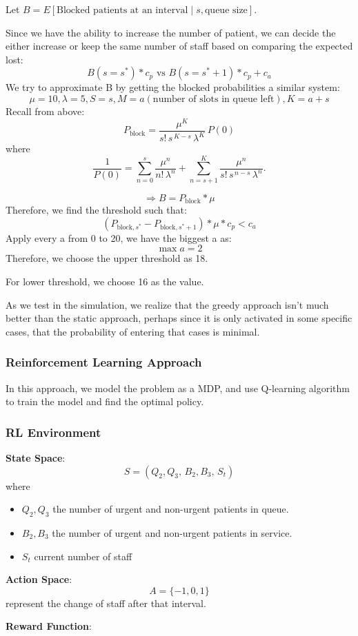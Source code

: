 \documentclass{article}
\begin{document}
Let $B = E[\text{Blocked patients at an interval} \mid s, \text{queue size}]$.

Since we have the ability to increase the number of patient, we can decide the either
increase or keep the same number of staff based on comparing the expected lost:
\[B(s = s^*) * c_p \text{ vs } B(s = s^*+1)* c_p + c_a\]
We try to approximate B by getting the blocked probabilities a similar system:
\[\mu = 10, \lambda = 5, S = s, M = a (\text{number of slots in queue left}), K = a+s\]
Recall from above:
\[P_{\text{block}} =\frac{\mu^K}{s!\,s^{\,K-s}\,\lambda^K} \, P(0)\]
where 
\[\dfrac{1}{P(0)}=\sum_{n=0}^{s}
\frac{\mu^n}{n!\,\lambda^n}
+\sum_{n=s+1}^{K}
\frac{\mu^n}{s!\,s^{\,n-s}\,\lambda^n}.
\]

\[\Rightarrow B = P_{\text{block}} * \mu\]
Therefore, we find the threshold such that:
\[(P_{\text{block}, s^*} - P_{\text{block}, s^*+1})*\mu * c_p < c_a\]
Apply every a from 0 to 20, we have the biggest a as:
\[\max a = 2\]
Therefore, we choose the upper threshold as 18.

For lower threshold, we choose 16 as the value.

As we test in the simulation, we realize that the greedy approach isn't much better than the static approach, perhaps since it is only activated in some specific cases, that the probability of entering that cases is minimal.

\subsubsection*{Reinforcement Learning Approach}
In this approach, we model the problem as a MDP, and use Q-learning algorithm
to train the model and find the optimal policy.
\subsubsection*{RL Environment}
\textbf{State Space}:
\[S = (Q_2,Q_3,\, B_2,B_3,\, S_t)\]
where
\begin{itemize}
    \item $Q_2, Q_3$ the number of urgent and non-urgent patients in queue.
    \item $B_2, B_3$ the number of urgent and non-urgent patients in service.
    \item $S_t$ current number of staff
\end{itemize}
\textbf{Action Space}:
\[A = \{-1, 0, 1\}\]
represent the change of staff after that interval.

\textbf{Reward Function}:
\end{document}

